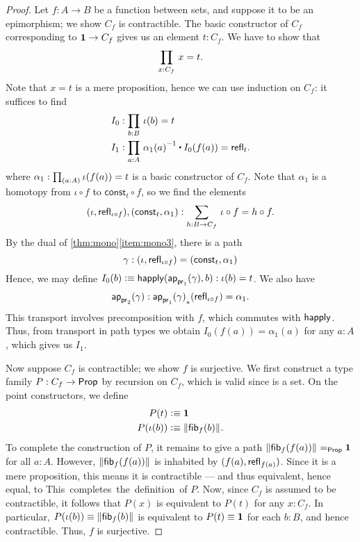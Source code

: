 \begin{proof}
Let $f:A\to B$ be a function between sets, and suppose it to be an epimorphism; we show $C_f$ is contractible.
The basic constructor of $C_f$ corresponding to
$\mathbf{1}\to C_f$ gives us an element $t:C_f$. We have to show that
\begin{equation*}
\prd{x:C_f} x= t.
\end{equation*}
Note that $x= t$ is a mere proposition, hence we can use induction on
$C_f$: it suffices to find
\begin{align*}
I_0 & : \prd{b:B} \iota(b)= t\\
I_1 & : \prd{a:A} \opp{\alpha_1(a)} \ct I_0(f(a))=\refl{t}.
\end{align*}
where $\alpha_1:\prd{a:A} \iota(f(a))= t$ is a basic constructor
of $C_f$. Note that $\alpha_1$ is a homotopy from $\iota\circ f$ to
$\mathsf{const}_t\circ f$, so we find the elements
\begin{equation*}
\pairr{\iota,\refl{\iota\circ f}},\pairr{\mathsf{const}_t,\alpha_1}:
\sm{h:B\to C_f} \iota\circ f = h\circ f.
\end{equation*}
By the dual of \autoref{thm:mono}\ref{item:mono3}, there is a path
\begin{equation*}
\gamma:{(\iota,\mathsf{refl}_{\iota\circ f})}={(\mathsf{const}_t,\alpha_1)}
\end{equation*}
Hence, we may define $I_0(b)\vcentcolon\equiv \mathsf{happly}(\mathsf{ap}_{\mathsf{pr}_{1}}(\gamma),b):\iota(b)=t$.
We also have
\[\mathsf{ap}_{\mathsf{pr}_{2}}(\gamma) : {\mathsf{ap}_{\mathsf{pr}_{1}}(\gamma)}_{*}\mathopen{}\left({\mathsf{refl}_{\iota\circ f}}\right)\mathclose{} = \alpha_1. \]
This transport involves precomposition with $f$, which commutes with $\mathsf{happly}$.
Thus, from transport in path types we obtain $I_0(f(a)) = \alpha_1(a)$ for any $a:A$, which gives us $I_1$.

Now suppose $C_f$ is contractible; we show $f$ is surjective.
We first construct a type family $P:C_f\to\mathsf{Prop}$ by recursion on $C_f$, which is valid since \prop is a set.
On the point constructors, we define
\begin{align*}
P(t) & \vcentcolon\equiv \mathbf{1}\\
P(\iota(b)) & \vcentcolon\equiv \mathopen{}\left\Vert {\mathsf{fib}}_{f}(b)\right\Vert_{}\mathclose{}.
\end{align*}
To complete the construction of $P$, it remains to give a path $\mathopen{}\left\Vert {\mathsf{fib}}_{f}(f(a))\right\Vert_{}\mathclose{} =_\mathsf{Prop} \mathbf{1}$ for all $a:A$.
However, $\mathopen{}\left\Vert {\mathsf{fib}}_{f}(f(a))\right\Vert_{}\mathclose{}$ is inhabited by $(f(a),\mathsf{refl}_{f(a)})$.
Since it is a mere proposition, this means it is contractible --- and thus equivalent, hence equal, to \unit.
This completes the definition of $P$.
Now, since $C_f$ is assumed to be contractible, it follows that $P(x)$ is equivalent to $P(t)$ for any $x:C_f$.
In particular, $P(\iota(b))\equiv \mathopen{}\left\Vert {\mathsf{fib}}_{f}(b)\right\Vert_{}\mathclose{}$ is equivalent to $P(t)\equiv \mathbf{1}$ for each $b:B$, and hence contractible.
Thus, $f$ is surjective.


\end{proof}
